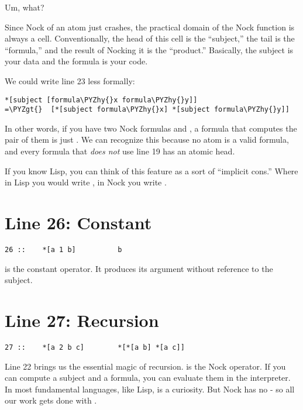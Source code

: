 Um, what?

Since Nock of an atom just crashes, the practical domain of the Nock function
is always a cell.  Conventionally, the head of this cell is the ``subject,'' the
tail is the ``formula,'' and the result of Nocking it is the ``product.''
Basically, the subject is your data and the formula is your code.

We could write line 23 less formally:

\begin{framed_shaded}
\begin{Verbatim}[fontsize=\relsize{-2.5},commandchars=\\\{\}]
*[subject [formula\PYZhy{}x formula\PYZhy{}y]]
=\PYZgt{}  [*[subject formula\PYZhy{}x] *[subject formula\PYZhy{}y]]
\end{Verbatim}
\end{framed_shaded}
In other words, if you have two Nock formulas  and , a formula that
computes the pair of them is just \kode{[x y]}.  We can recognize this because no
atom is a valid formula, and every formula that \emph{does not} use line 19 has an
atomic head.

If you know Lisp, you can think of this feature as a sort of ``implicit cons.''
Where in Lisp you would write , in Nock you write \kode{[x y]}.

\section{Line 26: Constant}

\begin{framed_shaded}
\begin{Verbatim}[fontsize=\relsize{-2.5},commandchars=\\\{\}]
26 ::    *[a 1 b]          b
\end{Verbatim}
\end{framed_shaded}
 is the constant operator.  It produces its argument without
reference to the subject. 

\section{Line 27: Recursion}

\begin{framed_shaded}
\begin{Verbatim}[fontsize=\relsize{-2.5},commandchars=\\\{\}]
27 ::    *[a 2 b c]        *[*[a b] *[a c]]
\end{Verbatim}
\end{framed_shaded}
Line 22 brings us the essential magic of recursion.   is the Nock operator.
If you can compute a subject and a formula, you can evaluate them in the
interpreter.  In most fundamental languages, like Lisp,  is a curiosity.
But Nock has no  - so all our work gets done with .

